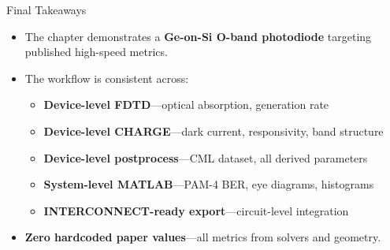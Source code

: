 ﻿\documentclass[aspectratio=169,11pt]{beamer}
\begin{document}
\begin{frame}{Final Takeaways}
\begin{itemize}
\item The chapter demonstrates a \textbf{Ge-on-Si O-band photodiode} targeting published high-speed metrics.
\item The workflow is consistent across:
\begin{itemize}
        \item \textbf{Device-level FDTD}---optical absorption, generation rate
        \item \textbf{Device-level CHARGE}---dark current, responsivity, band structure
        \item \textbf{Device-level postprocess}---CML dataset, all derived parameters
        \item \textbf{System-level MATLAB}---PAM-4 BER, eye diagrams, histograms
        \item \textbf{INTERCONNECT-ready export}---circuit-level integration
\end{itemize}
\item \textbf{Zero hardcoded paper values}---all metrics from solvers and geometry.
\end{itemize}
\end{frame}
\end{document}
